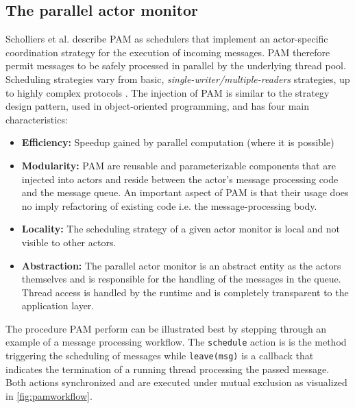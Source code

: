 \documentclass[11pt, journal]{IEEEtran}
\newcommand{\ct}{\lstinline[backgroundcolor=\color{white},basicstyle=\footnotesize\ttfamily]}
\begin{document}
\subsection{The parallel actor monitor}\label{subsec:thepam}
Scholliers et al. describe PAM as schedulers that implement an actor-specific coordination strategy for the execution of incoming messages. PAM therefore permit messages to be safely processed in parallel by the underlying thread pool. Scheduling strategies vary from basic, \textit{single-writer/multiple-readers} strategies, up to highly complex protocols \cite{Scholliers2010a}.
The injection of PAM is similar to the strategy design pattern, used in object-oriented programming, and has four main characteristics:\\
\begin{itemize}
	\item \textbf{Efficiency:} Speedup gained by parallel computation (where it is possible)
	\item \textbf{Modularity:} PAM are reusable and parameterizable components that are injected into actors and reside between the actor's message processing code and the message queue. An important aspect of PAM is that their usage does no imply refactoring of existing code i.e. the message-processing body\cite{Scholliers2010a}.
	\item \textbf{Locality:} The scheduling strategy of a given actor monitor is local and not visible to other actors.
	\item \textbf{Abstraction:} The parallel actor monitor is an abstract entity as the actors themselves and is responsible for the handling of the messages in the queue. Thread access is handled by the runtime and is completely transparent to the application layer.\\
\end{itemize}
The procedure PAM perform can be illustrated best by stepping through an example of a message processing workflow. The \ct{schedule} action is is the method triggering the scheduling of messages while \ct{leave(msg)} is a callback that indicates the termination of a running thread processing the passed message. Both actions synchronized and are executed under mutual exclusion as visualized in \autoref{fig:pamworkflow}.\\
\end{document}
